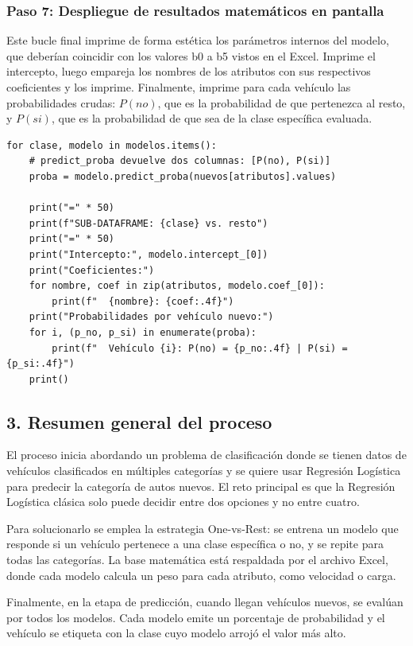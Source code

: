 \documentclass[]{article}
\begin{document}
\subsubsection*{Paso 7: Despliegue de resultados matemáticos en pantalla}

Este bucle final imprime de forma estética los parámetros internos del modelo, que deberían coincidir con los valores b0 a b5 vistos en el Excel. Imprime el intercepto, luego empareja los nombres de los atributos con sus respectivos coeficientes y los imprime. Finalmente, imprime para cada vehículo las probabilidades crudas: $P(no)$, que es la probabilidad de que pertenezca al resto, y $P(si)$, que es la probabilidad de que sea de la clase específica evaluada.

\begin{lstlisting}
for clase, modelo in modelos.items():
    # predict_proba devuelve dos columnas: [P(no), P(si)]
    proba = modelo.predict_proba(nuevos[atributos].values)

    print("=" * 50)
    print(f"SUB-DATAFRAME: {clase} vs. resto")
    print("=" * 50)
    print("Intercepto:", modelo.intercept_[0])
    print("Coeficientes:")
    for nombre, coef in zip(atributos, modelo.coef_[0]):
        print(f"  {nombre}: {coef:.4f}")
    print("Probabilidades por vehículo nuevo:")
    for i, (p_no, p_si) in enumerate(proba):
        print(f"  Vehículo {i}: P(no) = {p_no:.4f} | P(si) = {p_si:.4f}")
    print()
\end{lstlisting}

\subsection{3. Resumen general del proceso}

El proceso inicia abordando un problema de clasificación donde se tienen datos de vehículos clasificados en múltiples categorías y se quiere usar Regresión Logística para predecir la categoría de autos nuevos. El reto principal es que la Regresión Logística clásica solo puede decidir entre dos opciones y no entre cuatro.

Para solucionarlo se emplea la estrategia One-vs-Rest: se entrena un modelo que responde si un vehículo pertenece a una clase específica o no, y se repite para todas las categorías. La base matemática está respaldada por el archivo Excel, donde cada modelo calcula un peso para cada atributo, como velocidad o carga.

Finalmente, en la etapa de predicción, cuando llegan vehículos nuevos, se evalúan por todos los modelos. Cada modelo emite un porcentaje de probabilidad y el vehículo se etiqueta con la clase cuyo modelo arrojó el valor más alto.
\end{document}
